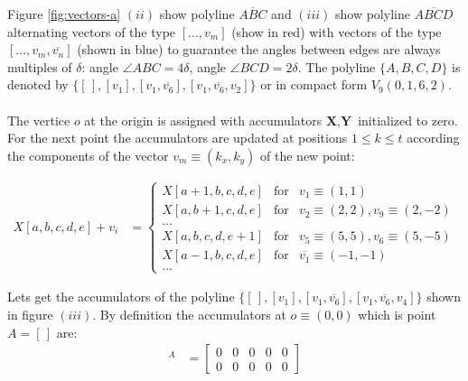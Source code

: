 \documentclass[11pt]{article}
\begin{document}
Figure \ref{fig:vectors-a} $(ii)$ show polyline $\overline{ABC}$ and $(iii)$ show polyline $\overline{ABCD}$ alternating vectors of the type $[...,v_m]$ (show in red) with vectors of the type $[...,v_m,\overline{v_n}]$ (shown in blue) to guarantee the angles between edges are always multiples of $\delta$: angle $\angle{ABC} = 4\delta$, angle $\angle{BCD} = 2\delta$. The polyline $\{A,B,C,D\}$ is denoted by $\{ [\hspace{2pt}], [v_1], [v_1, \overline{v_6}], [v_1,\overline{v_6},v_2] \}$ or in compact form $V_9(0,1,6,2)$.
\\
\\
The vertice $o$ at the origin is assigned with accumulators $\textbf{X},\textbf{Y}$ initialized to zero. For the next point the accumulators are updated at positions $1 \leq k \leq t$ according the components of the vector $v_m\equiv(k_x,k_y)$ of the new point:

\begin{align}
X[a,b,c,d,e] + v_i &= \left\{ \begin{array}{ccl}
 X[a+1,b,c,d,e] & \mbox{for} & v_1\equiv(1,1) \\
 X[a,b+1,c,d,e] & \mbox{for} & v_2\equiv(2,2), v_9\equiv(2,-2)\\
 ... & & \\
 X[a,b,c,d,e+1] & \mbox{for} & v_5\equiv(5,5), v_6\equiv(5,-5)\\
 X[a-1,b,c,d,e] & \mbox{for} & \overline{v_1}\equiv(-1,-1) \\
 ... & &
 \end{array}\right.
\end{align}

Lets get the accumulators of the polyline $\{[\hspace{2pt}], [v_1], [v_1,\overline{v_6}], [v_1,\overline{v_6},v_4]\}$ shown in figure $(iii)$. By definition the accumulators at $o \equiv (0,0)$ which is point $A=[\hspace{2pt}]$ are:
\begin{align}
[\hspace{2pt}]^A &= \left[\begin{array}{ccccc}0&0&0&0&0 \\ 0&0&0&0&0 \end{array}\right]
\end{align}
\end{document}
